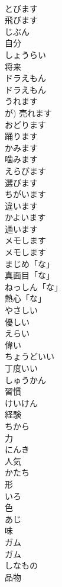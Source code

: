 \documentclass[8pt]{extreport}
\begin{document}
\begin{CJK}{UTF8}{min}
\\	とびます	
\\	飛びます		
\\	じぶん	
\\	自分		
\\	しょうらい	
\\	将来		
\\	ドラえもん	
\\	ドラえもん		
\\	うれます	
\\	が)	売れます	
\\	おどります	
\\	踊ります		
\\	かみます	
\\	噛みます	
\\	えらびます	
\\	選びます	
\\	ちがいます	
\\	違います	
\\	かよいます	
\\	通います		
\\	メモします	
\\	メモします	
\\	まじめ「な」	
\\	真面目「な」	
\\	ねっしん「な」	
\\	熱心「な」	
\\	やさしい	
\\	優しい	
\\	えらい	
\\	偉い		
\\	ちょうどいい	
\\	丁度いい	
\\	しゅうかん	
\\	習慣	
\\	けいけん	
\\	経験	
\\	ちから	
\\	力		
\\	にんき	
\\	人気	
\\	かたち	
\\	形	
\\	いろ	
\\	色	
\\	あじ	
\\	味	
\\	ガム	
\\	ガム		
\\	しなもの	
\\	品物		

\end{CJK}
\end{document}
